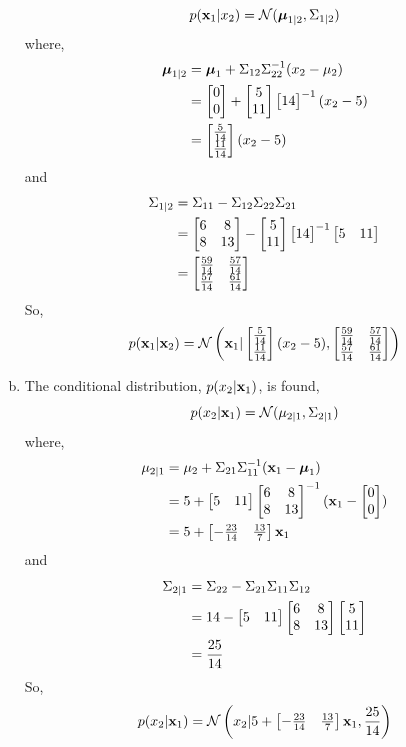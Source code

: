 \documentclass[12pt,letterpaper,fleqn]{hmcpset}
\begin{document}
\begin{solution}
\begin{enumerate}[(a)]
            $$
                p({\bf x}_1 | x_2) = {\cal N}(\hbox{\boldmath$\mu$}_{1|2}, \Sigma_{1|2})\\
            $$
            where,
            \begin{align*}
                \hbox{\boldmath$\mu$}_{1|2} &= \hbox{\boldmath$\mu$}_1 + \Sigma_{12} \Sigma_{22}^{-1}(x_2 - \mu_2) \\
                 &= \begin{bmatrix} 0\\0 \end{bmatrix} + \begin{bmatrix} 5\\11 \end{bmatrix} \begin{bmatrix} 14 \end{bmatrix}^{-1} (x_2 - 5)\\
                 &= \begin{bmatrix} \frac{5}{14}\\\frac{11}{14} \end{bmatrix}(x_2 - 5)
            \end{align*}
            and
            \begin{align*}
                \Sigma_{1|2} &= \Sigma_{11} - \Sigma_{12}\Sigma_{22}\Sigma_{21}\\
                &= \begin{bmatrix} 6 & 8\\ 8 & 13 \end{bmatrix} - \begin{bmatrix} 5\\11 \end{bmatrix} \begin{bmatrix} 14 \end{bmatrix}^{-1} \begin{bmatrix} 5 & 11 \end{bmatrix}\\
                &= \begin{bmatrix} \frac{59}{14} & \frac{57}{14} \\ \frac{57}{14} & \frac{61}{14}  \end{bmatrix}\\
            \end{align*}
            So,
            $$  p({\bf x}_1 | {\bf x}_2) = {\cal N} \left({\bf x}_1 | \begin{bmatrix} \frac{5}{14}\\\frac{11}{14} \end{bmatrix}(x_2 - 5), \begin{bmatrix} \frac{59}{14} & \frac{57}{14} \\ \frac{57}{14} & \frac{61}{14}  \end{bmatrix} \right) $$
        \item
            The conditional distribution, $p(x_2 | {\bf x}_1)$, is found,
            $$
                p(x_2 | {\bf x}_1) = {\cal N}(\mu_{2|1}, \Sigma_{2|1})\\
            $$
            where,
            \begin{align*}
                \mu_{2|1} &= \mu_2 + \Sigma_{21} \Sigma_{11}^{-1}({\bf x}_1 - \hbox{\boldmath$\mu$}_1) \\
                &= 5 + \begin{bmatrix} 5 & 11 \end{bmatrix} \begin{bmatrix} 6 & 8\\ 8 & 13 \end{bmatrix}^{-1} ({\bf x}_1 - \begin{bmatrix} 0\\0 \end{bmatrix})\\
                &= 5 + \begin{bmatrix} -\frac{23}{14} & \frac{13}{7} \end{bmatrix}{\bf x}_1
            \end{align*}
            and
            \begin{align*}
                \Sigma_{2|1} &= \Sigma_{22} - \Sigma_{21}\Sigma_{11}\Sigma_{12}\\
                &= 14 - \begin{bmatrix} 5 & 11 \end{bmatrix} \begin{bmatrix} 6 & 8\\ 8 & 13 \end{bmatrix} \begin{bmatrix} 5 \\ 11 \end{bmatrix} \\
                &= \frac{25}{14}              
            \end{align*}
            So, 
            $$ p(x_2 | {\bf x}_1) = {\cal N} \left( x_2 | 5 + \begin{bmatrix} -\frac{23}{14} & \frac{13}{7} \end{bmatrix}{\bf x}_1, \frac{25}{14} \right) $$
    \end{enumerate}
\end{solution}
\end{document}

